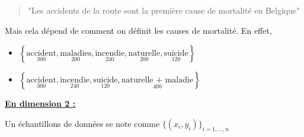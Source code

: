 \begin{remarque}
\begin{center}
\end{center}
\newpage
\begin{quote}
    "Les accidents de la route sont la première cause de mortalité en Belgique"
\end{quote}
Mais cela dépend de comment on définit les causes de mortalité. En effet,
\begin{itemize}
    \item $\left\{\underset{300}{\text{accident}}, \underset{200}{\text{maladies}}, \underset{240}{\text{incendie}}, \underset{200}{\text{naturelle}}, \underset{120}{\text{suicide}}\right\}$
    \item $\left\{\underset{300}{\text{accident}}, \underset{240}{\text{incendie}}, \underset{120}{\text{suicide}}, \underset{400}{\text{naturelle + maladie}}\right\}$
\end{itemize}

\end{remarque}

\underline{\textbf{En dimension 2 : }}

Un échantillons de données se note comme $\{(x_i,y_i)\}_{i=1, \dots , n}$

